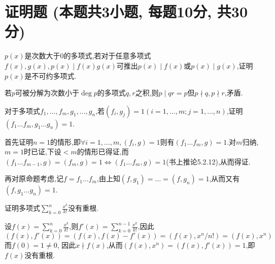 \documentclass{exam-zh}
\begin{document}
\section{证明题 (本题共3小题, 每题10分, 共30分)}
\begin{problem}
    $p(x)$是次数大于0的多项式,若对于任意多项式$f(x), g(x), p(x)\mid f(x)g(x)$可推出$p(x)\mid f(x)$或$p(x)\mid g(x)$,证明$p(x)$是不可约多项式.
\end{problem}
\begin{solution}
    若$p$可被分解为次数小于$\deg p$的多项式$q,r$之积,则$p\mid qr=p$但$p\nmid q, p\nmid r$,矛盾.
\end{solution}
\vspace{20em}

\newpage
\begin{problem}
    对于多项式$f_1,\dots,f_m,g_1,\dots,g_n$,若$(f_i,g_j)=1 (i=1,\dots,m; j=1,\dots,n)$,证明$(f_1 \dots f_m, g_1 \dots g_n)=1$.
\end{problem}
\begin{solution}
    首先证明$n=1$的情形,即$\forall i=1,\dots,m, (f_i,g)=1$则有$(f_1\dots f_m,g)=1$.对$m$归纳,$m=1$时已证,下设$<m$的情形已得证,而$(f_1\dots f_{m-1},g)=(f_m,g)=1\iff (f_1\dots f_m,g)=1$(书上推论5.2.12),从而得证.

    再对原命题考虑,记$f=f_1\dots f_m$,由上知$(f,g_1)=\dots=(f,g_n)=1$,从而又有$(f,g_1\dots g_n)=1$.
\end{solution}
\vspace{20em}
\begin{problem}
    证明多项式$\displaystyle\sum_{k=0}^{n}\frac{x^k}{k!}$没有重根.
\end{problem}
\begin{solution}
    设$\displaystyle f(x)=\sum_{k=0}^{n}\frac{x^k}{k!}$,则$\displaystyle f'(x)=\sum_{k=0}^{n-1}\frac{x^k}{k!}$,因此
    $$(f(x),f'(x))=(f(x),f(x)-f'(x))=(f(x),x^n/n!)=(f(x),x^n)$$
    而$f(0)=1\neq 0$, 因此$x\nmid f(x)$,从而$(f(x),x^n)=(f(x),f'(x))=1$,即$f(x)$没有重根.
\end{solution}
\vspace{20em}
\end{document}
